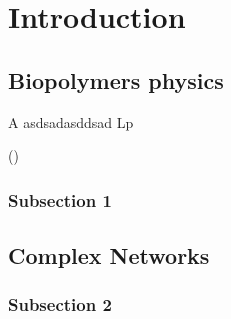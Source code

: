 
\chapter{Introduction} %

\label{Introduction} %



    
    

\section{Biopolymers physics}


\gls{A} asdsadasddsad 
\gls{Lp}  
     

 (\citet{storm_nonlinear_2005})
\citet{stein_algorithm_2008}



\subsection{Subsection 1}






\section{Complex Networks}

\subsection{Subsection 2}
